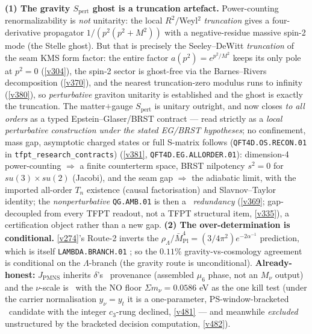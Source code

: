\documentclass[11pt,a4paper]{article}
\newcommand{\Mpl}{\bar M_{\mathrm{Pl}}}
\begin{document}
\begin{keybox}
\textbf{(1) The gravity $S_{\mathrm{pert}}$ ghost is a truncation artefact.} Power-counting renormalizability is
\emph{not} unitarity: the local $R^2/$Weyl$^2$ \emph{truncation} gives a four-derivative propagator
$1/(p^2(p^2+M^2))$ with a negative-residue massive spin-2 mode (the Stelle ghost). But that is precisely the
Seeley--DeWitt \emph{truncation} of the seam KMS form factor: the entire factor $a(p^2){=}e^{p^2/M^2}$ keeps its
only pole at $p^2{=}0$ (\vref{v304}), the spin-2 sector is ghost-free via the Barnes--Rivers decomposition
(\vref{v370}), and the nearest truncation-zero modulus runs to infinity (\vref{v380}), so \emph{perturbative}
graviton unitarity is established and the ghost is exactly the truncation. The matter$+$gauge $S_{\mathrm{pert}}$ is
unitary outright, and now closes \emph{to all orders} as a typed Epstein--Glaser/BRST contract --- read strictly
as a \emph{local perturbative construction under the stated EG/BRST hypotheses}; no confinement, mass gap,
asymptotic charged states or full S-matrix follows (\texttt{QFT4D.OS.RECON.01} in \texttt{tfpt\_research\_contracts})
(\vref{v381}, \texttt{QFT4D.EG.ALLORDER.01}): dimension-4 power-counting $\Rightarrow$ a finite counterterm space,
BRST nilpotency $s^2{=}0$ for $su(3){\times}su(2)$ (Jacobi), and the seam gap $\Rightarrow$ the adiabatic limit,
with the imported all-order $T_n$ existence (causal factorisation) and Slavnov--Taylor identity; the
\emph{nonperturbative} \texttt{QG.AMB.01} is then a \mC\ \emph{redundancy} (\vref{v369};
gap-decoupled from every TFPT readout, not a TFPT structural item, \vref{v335}), a certification object rather than
a new gap.
\textbf{(2) The over-determination is conditional.} \vref{v274}'s Route-2 inverts the
$\rho_\Lambda/\Mpl^4=(3/4\pi^2)e^{-2\alpha^{-1}}$ prediction, which is itself \texttt{LAMBDA.BRANCH.01} \mC;
so the $0.11\%$ gravity-vs-cosmology agreement is conditional on the $\Lambda$-branch (the gravity route is
unconditional). \textbf{Already-honest:} $J_{\mathrm{PMNS}}$ inherits $\delta$'s \mC\ provenance (assembled
$\mu_6$ phase, not an $M_\nu$ output) and the $\nu$-scale is \mO\ with the NO floor $\Sigma m_\nu=0.0586$ eV as
the one kill test (under the carrier normalisation $y_\nu{=}y_t$ it is a one-parameter, PS-window-bracketed
\mO\ candidate with the integer $c_3$-rung declined, \vref{v481} --- and meanwhile \emph{excluded}
unstructured by the bracketed decision computation, \vref{v482}).
\end{keybox}
\end{document}
